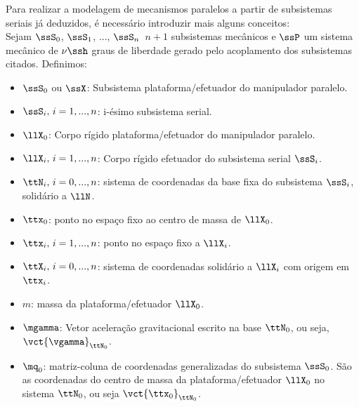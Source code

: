 \documentclass[]{politex}
\begin{document}
Para realizar a modelagem de mecanismos paralelos a partir de subsistemas seriais j\'a deduzidos, \'e necess\'ario introduzir mais alguns conceitos: \\

Sejam $\ssS_0$, $\ssS_1$, ..., $\ssS_{n} \,$ $n+1$ subsistemas mec\^anicos e $\ssP$ um sistema mec\^anico de $\nu\ssh$ graus de liberdade gerado pelo acoplamento dos subsistemas citados. Definimos:

\begin{itemize}
\item $\ssS_0$ ou $\ssX$: Subsistema plataforma/efetuador do manipulador paralelo.
\item $\ssS_i, \, i=1,...,n$: i-ésimo subsistema serial.
\item $\llX_0$: Corpo rígido plataforma/efetuador do manipulador paralelo.
\item $\llX_i, \, i=1,...,n$: Corpo rígido efetuador do subsistema serial $\ssS_i$.
\item $\ttN_i, \, i=0,...,n$: sistema de coordenadas da base fixa do subsistema $\ssS_i$, solidário a $\llN$.
\item $\ttx_0$: ponto no espa\c{c}o fixo ao centro de massa de $\llX_0$.
\item $\ttx_i, \,i=1, ..., n$: ponto no espa\c{c}o fixo a $\llX_i$.
\item $\ttX_i, \,i=0, ..., n$: sistema de coordenadas solidário a $\llX_i$ com origem em $\ttx_i$.
\item $m$: massa da plataforma/efetuador $\llX_0$.
\item $\mgamma$: Vetor aceleração gravitacional escrito na base $\ttN_0$, ou seja, $\vct{\vgamma}_{\ttN_0}$.
\item $\mq_0$: matriz-coluna de coordenadas generalizadas do subsistema $\ssS_0$. São as coordenadas do centro de massa da plataforma/efetuador $\llX_0$ no sistema $\ttN_0$, ou seja $\vct{\ttx_0}_{\ttN_0}$.

\end{itemize}
\end{document}
